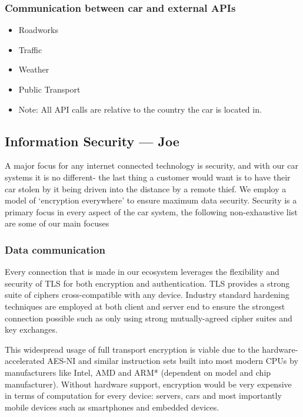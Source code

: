 \documentclass{article}
\begin{document}
\subsubsection{Communication between car and external APIs}
\begin{itemize}
  \item Roadworks
  \item Traffic
  \item Weather
  \item Public Transport
  \item Note: All API calls are relative to the country the car is located in.
\end{itemize}

\subsection{Information Security --- Joe}\label{ssec:information-security}
A major focus for any internet connected technology is security, and with our car systems it is no different- the last thing a customer would want is to have their car stolen by it being driven into the distance by a remote thief. We employ a model of `encryption everywhere' to ensure maximum data security. Security is a primary focus in every aspect of the car system, the following non-exhaustive list are some of our main focuses

\subsubsection{Data communication}
Every connection that is made in our ecosystem leverages the flexibility and security of TLS for both encryption and authentication. TLS provides a strong suite of ciphers cross-compatible with any device. Industry standard hardening techniques are employed at both client and server end to ensure the strongest connection possible such as only using strong mutually-agreed cipher suites and key exchanges.

This widespread usage of full transport encryption is viable due to the hardware-accelerated AES-NI and similar instruction sets built into most modern CPUs by manufacturers like Intel, AMD and ARM* (dependent on model and chip manufacturer). Without hardware support, encryption would be very expensive in terms of computation for every device: servers, cars and most importantly mobile devices such as smartphones and embedded devices.
\end{document}
